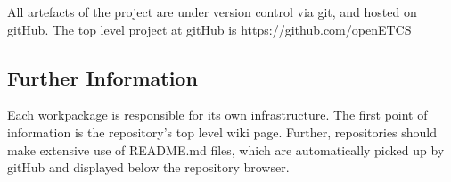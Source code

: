 \documentclass{template/openetcs_report}
\begin{document}
All artefacts of the project are under version control via git, and hosted on gitHub. The top level project at gitHub is https://github.com/openETCS

\subsection{Further Information}

Each workpackage is responsible for its own infrastructure. The first point of information is the repository's top level wiki page. Further, repositories should make extensive use of README.md files, which are automatically picked up by gitHub and displayed below the repository browser.




%  
%  

%  
%  

\end{document}
